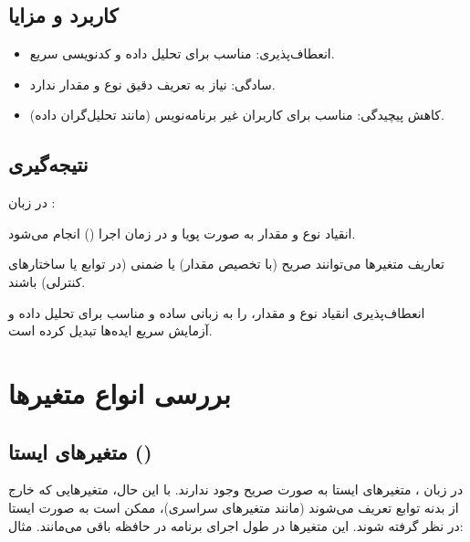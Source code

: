 \documentclass[11pt, a4paper, oneside]{book}
\newcounter{itemadded}
\let\LaTeXStandardEnumerateBegin\enumerate
\let\LaTeXStandardEnumerateEnd\endenumerate
\renewenvironment{enumerate}{%
	\LaTeXStandardEnumerateBegin%
	\setcounter{itemadded}{0}
}{%
	\LaTeXStandardEnumerateEnd%
}%
\begin{document}
			\subsection{کاربرد و مزایا}
				
				\begin{itemize}
					
					\item {\large انعطاف‌پذیری}:
					{\normalsize مناسب برای تحلیل داده و کدنویسی سریع.}
					
					\item {\large سادگی}:
					{\normalsize نیاز به تعریف دقیق نوع و مقدار ندارد.}
					
					\item {\large کاهش پیچیدگی}:
					{\normalsize مناسب برای کاربران غیر برنامه‌نویس (مانند تحلیل‌گران داده).}
					
				\end{itemize}
				
			
			\subsection{نتیجه‌گیری}
				
				
				در زبان :
			
				\begin{enumerate}
					
					\item انقیاد نوع و مقدار به صورت پویا و در زمان اجرا () انجام می‌شود.
					
					\item تعاریف متغیرها می‌توانند صریح (با تخصیص مقدار) یا ضمنی (در توابع یا ساختارهای کنترلی) باشند.
					
					\item انعطاف‌پذیری انقیاد نوع و مقدار،  را به زبانی ساده و مناسب برای تحلیل داده و آزمایش سریع ایده‌ها تبدیل کرده است.
					
				\end{enumerate}
		
		\section{بررسی انواع متغیرها}
		
			\subsection{متغیرهای ایستا ()}
				در زبان ، متغیرهای ایستا به صورت صریح وجود ندارند. با این حال، متغیرهایی که خارج از بدنه توابع تعریف می‌شوند (مانند متغیرهای سراسری)، ممکن است به صورت ایستا در نظر گرفته شوند. این متغیرها در طول اجرای برنامه در حافظه باقی می‌مانند. مثال:
				
\end{document}
